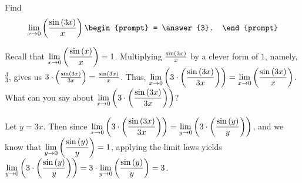 \documentclass{ximera}
\author{Gregory Hartman \and Matthew Carr}
\begin{document}
\begin{exercise}




Find 
\[
\lim_{x\to0}\p{\frac{\sin\p{3x}}{x}}
\begin{prompt}
= \answer{3}.
\end{prompt}
\]

\begin{hint}
Recall that $\lim_{x\to0}\p{\frac{\sin\p{x}}{x}}=1$. Multiplying $\frac{\sin\left(3x\right)}{x}$ by a clever form of $1$, namely, $\frac{3}{3}$, gives us $3\cdot\left(\frac{\sin\left(3x\right)}{3x}\right)=\frac{\sin\left(3x\right)}{x}$. Thus, $\lim_{x\to0}\p{3\cdot\p{\frac{\sin\p{3x}}{3x}}}=\lim_{x\to0}\p{\frac{\sin\p{3x}}{x}}$. What can you say about $\lim_{x\to0}\p{3\cdot\p{\frac{\sin\p{3x}}{3x}}}$?
\end{hint}
\begin{hint}
Let $y=3x$. Then since $\lim_{x\to0}\p{3\cdot\p{\frac{\sin\p{3x}}{3x}}}=\lim_{y\to0}\p{3\cdot\p{\frac{\sin\p{y}}{y}}}$, and we know that $\lim_{y\to0}\p{\frac{\sin\p{y}}{y}}=1$, applying the limit laws yields $\lim_{y\to0}\p{3\cdot\p{\frac{\sin\p{y}}{y}}}=3\cdot\lim_{y\to0}\p{\frac{\sin\p{y}}{y}}=3$.
\end{hint}

\end{exercise}
\end{document}
